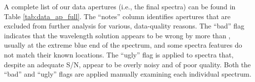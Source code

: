 




A complete list of our data apertures (i.e., the final spectra) can be
found in Table \ref{tab:data_ap_full}. The ``notes'' column identifies
apertures that are excluded from further analysis for various,
data-quality reasons. The ``bad'' flag indicates that the wavelength
solution appears to be wrong by more than ,
usually at the extreme blue end of the spectrum, and some spectra
features do not match their known locations. The ``ugly'' flag is
applied to spectra that, despite an adequate S/N, appear to be overly
noisy and of poor quality. Both the ``bad'' and ``ugly'' flags are
applied manually examining each individual spectrum.

